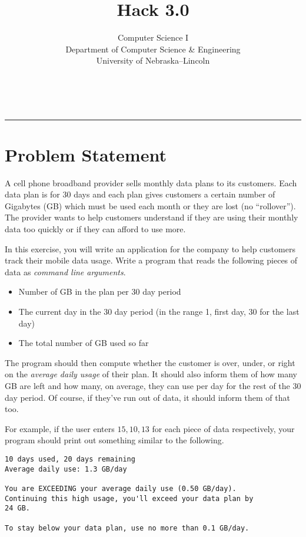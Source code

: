 \documentclass[12pt]{scrartcl}
\title{Hack 3.0}\let\Title\@title
\subtitle{Computer Science I\\
{\small
\vskip1cm
Department of Computer Science \& Engineering \\
University of Nebraska--Lincoln}
\vskip-1cm}
\date{~}
\begin{document}
\maketitle

\hrule




\section*{Problem Statement}

A cell phone broadband provider sells monthly data plans to its
customers.  Each data plan is for 30 days and each plan gives
customers a certain number of Gigabytes (GB) which must be used 
each month or they are lost (no ``rollover'').  The provider wants
to help customers understand if they are using their monthly data
too quickly or if they can afford to use more.

In this exercise, you will write an application for the company
to help customers track their mobile data usage.  Write a program
that reads the following pieces of data as \emph{command line arguments}.
\begin{itemize}
  \item Number of GB in the plan per 30 day period
  \item The current day in the 30 day period (in the range 1, first day, 
  30 for the last day)
  \item The total number of GB used so far
\end{itemize}
The program should then compute whether the customer is over, 
under, or right on the \emph{average daily usage} of their plan.  
It should also inform them of how many GB are left and how many, 
on average, they can use per day for the rest of the 30 day period.  
Of course, if they've run out of data, it should inform them of that 
too.

For example, if the user enters $15, 10, 13$ for each piece of data
respectively, your program should print out something similar to 
the following.

\begin{verbatim}
10 days used, 20 days remaining
Average daily use: 1.3 GB/day

You are EXCEEDING your average daily use (0.50 GB/day).
Continuing this high usage, you'll exceed your data plan by
24 GB.

To stay below your data plan, use no more than 0.1 GB/day.
\end{verbatim}
\end{document}
